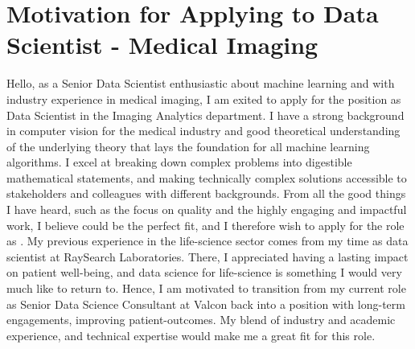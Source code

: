 \section{Motivation for Applying to Data Scientist - Medical Imaging}
Hello, as a Senior Data Scientist enthusiastic about machine learning and with industry experience in medical imaging, I am exited to apply for the position as Data Scientist in the Imaging Analytics department.
I have a strong background in computer vision for the medical industry and good theoretical understanding of the underlying theory that lays the foundation for all machine learning algorithms.
I excel at breaking down complex problems into digestible mathematical statements, and making technically complex solutions accessible to stakeholders and colleagues with different backgrounds.
From all the good things I have heard, such as the focus on quality and the highly engaging and impactful work, I believe \company{} could be the perfect fit, and I therefore wish to apply for the role as \role{}.
\newpar My previous experience in the life-science sector comes from my time as data scientist at RaySearch Laboratories.
There, I appreciated having a lasting impact on patient well-being, and data science for life-science is something I would very much like to return to.
Hence, I am motivated to transition from my current role as Senior Data Science Consultant at Valcon back into a position with long-term engagements, improving patient-outcomes.
My blend of industry and academic experience, and technical expertise would make me a great fit for this role.